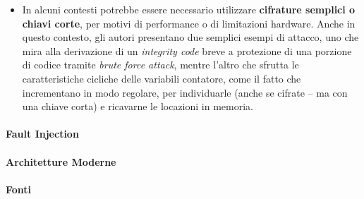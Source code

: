 \documentclass[a4paper,12pt]{article}
\begin{document}
\begin{itemize}
    dopo che il codice infetto viene criptato, l'attaccante può ridirezionare il puntatore verso tale codice per farlo eseguire in un contesto protetto. Nel secondo esempio, l'attaccante cerca di sfruttare le \textit{linked list} per ridirezionare l'ultimo puntatore della lista ad un elemento segreto per poterlo rivelare in uno spazio non protetto. Le soluzioni
    a questo tipo di attacchi prevedono anche l'impiego di \textit{program analysis} o di diverse tecniche di compilazione.
    \item In alcuni contesti potrebbe essere necessario utilizzare \textbf{cifrature semplici o chiavi corte}, per motivi di performance o di limitazioni hardware. Anche in questo contesto, gli autori presentano due semplici esempi di attacco, uno che mira alla derivazione di un \textit{integrity code} breve a protezione di una porzione di codice tramite \textit{brute force attack}, 
    mentre l'altro che sfrutta le caratteristiche cicliche delle variabili contatore, come il fatto che incrementano in modo regolare, per individuarle (anche se cifrate -- ma con una chiave corta) e ricavarne le locazioni in memoria.
\end{itemize}
\paragraph{Fault Injection}
\paragraph{Architetture Moderne}
\paragraph{Fonti}
\end{document}
